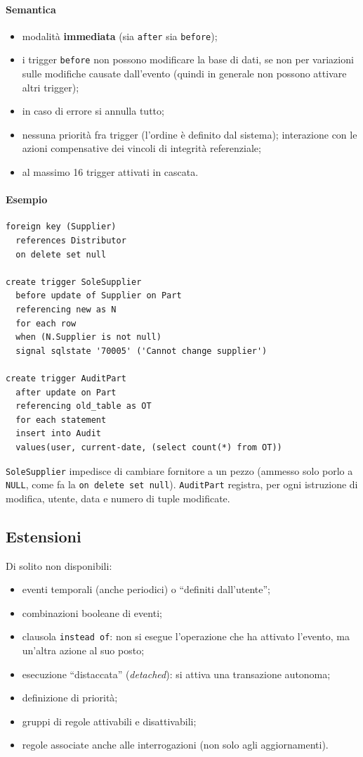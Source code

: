 \documentclass[a4paper,12pt]{article}
\begin{document}
\paragraph{Semantica}
\begin{itemize}
  \item modalità \textbf{immediata} (sia \texttt{after} sia \texttt{before});
  \item i trigger \texttt{before} non possono modificare la base di dati, se
    non per variazioni sulle modifiche causate dall'evento (quindi in generale
    non possono attivare altri trigger);
  \item in caso di errore si annulla tutto;
  \item nessuna priorità fra trigger (l'ordine è definito dal sistema);
    interazione con le azioni compensative dei vincoli di integrità
    referenziale;
  \item al massimo 16 trigger attivati in cascata.
\end{itemize}

\paragraph{Esempio}
\begin{verbatim}
foreign key (Supplier)
  references Distributor
  on delete set null

create trigger SoleSupplier
  before update of Supplier on Part
  referencing new as N
  for each row
  when (N.Supplier is not null)
  signal sqlstate '70005' ('Cannot change supplier')

create trigger AuditPart
  after update on Part
  referencing old_table as OT
  for each statement
  insert into Audit
  values(user, current-date, (select count(*) from OT))
\end{verbatim}
\texttt{SoleSupplier} impedisce di cambiare fornitore a un pezzo (ammesso solo
porlo a \texttt{NULL}, come fa la \texttt{on delete set null}).
\texttt{AuditPart} registra, per ogni istruzione di modifica, utente, data e
numero di tuple modificate.

\subsection{Estensioni}

Di solito non disponibili:
\begin{itemize}
  \item eventi temporali (anche periodici) o ``definiti dall'utente'';
  \item combinazioni booleane di eventi;
  \item clausola \texttt{instead of}: non si esegue l'operazione che ha
    attivato l'evento, ma un'altra azione al suo posto;
  \item esecuzione ``distaccata'' (\emph{detached}): si attiva una
    transazione autonoma;
  \item definizione di priorità;
  \item gruppi di regole attivabili e disattivabili;
  \item regole associate anche alle interrogazioni (non solo agli
    aggiornamenti).
\end{itemize}
\end{document}
